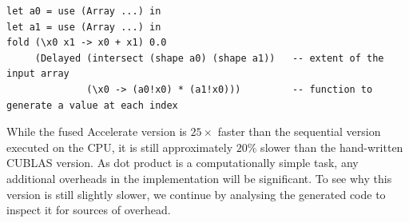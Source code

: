 \begin{lstlisting}[style=haskell]
let a0 = use (Array ...) in
let a1 = use (Array ...) in
fold (\x0 x1 -> x0 + x1) 0.0
     (Delayed (intersect (shape a0) (shape a1))   -- extent of the input array
              (\x0 -> (a0!x0) * (a1!x0)))         -- function to generate a value at each index
\end{lstlisting}

While the fused Accelerate version is $25\times$ faster than the sequential
version executed on the CPU, it is still approximately $20\%$ slower than the
hand-written CUBLAS version. As dot product is a computationally simple task,
any additional overheads in the implementation will be significant. To see why
this version is still slightly slower, we continue by analysing the generated
code to inspect it for sources of overhead.


